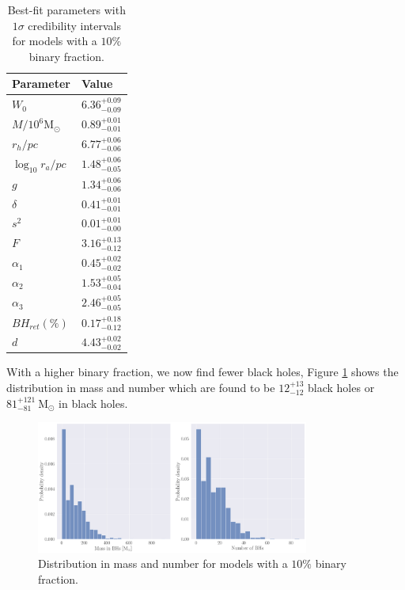 \begin{table}
	\centering
	\caption{Best-fit parameters with $1\sigma$ credibility intervals for models with a $10\%$ binary fraction.}
	\begin{tabular}{l l}

		\hline
		Parameter                 & Value                  \\
		\hline
		$W_0$                     & $6.36^{+0.09}_{-0.09}$ \\
		$M/10^6 \mathrm{M}_\odot$ & $0.89^{+0.01}_{-0.01}$ \\
		$r_h / pc$                & $6.77^{+0.06}_{-0.06}$ \\
		$\log_{10}{r_a / pc}$     & $1.48^{+0.06}_{-0.05}$ \\
		$g$                       & $1.34^{+0.06}_{-0.06}$ \\
		$\delta$                  & $0.41^{+0.01}_{-0.01}$ \\
		$s^2$                     & $0.01^{+0.01}_{-0.00}$ \\
		$F$                       & $3.16^{+0.13}_{-0.12}$ \\
		$\alpha_1$                & $0.45^{+0.02}_{-0.02}$ \\
		$\alpha_2$                & $1.53^{+0.05}_{-0.04}$ \\
		$\alpha_3$                & $2.46^{+0.05}_{-0.05}$ \\
		$BH_{ret} (\%)$           & $0.17^{+0.18}_{-0.12}$ \\
		$d$                       & $4.43^{+0.02}_{-0.02}$ \\
		\hline
	\end{tabular}
	\label{tab:parameters_highbin}
\end{table}

With a higher binary fraction, we now find fewer black holes, Figure
\ref{fig:high_bin_model_BH_dists} shows the distribution in mass and number which are found to be
$12^{+13}_{-12}$ black holes or $81 ^{+121}_{-81} \ \mathrm{M}_\odot$ in black holes.


\begin{figure}
	\centering
	\includegraphics[width=0.8\textwidth]{figures/high_bin_model/BH_dists.png}
	\caption{Distribution in mass and number for models with a $10\%$ binary fraction.}
	\label{fig:high_bin_model_BH_dists}
\end{figure}


